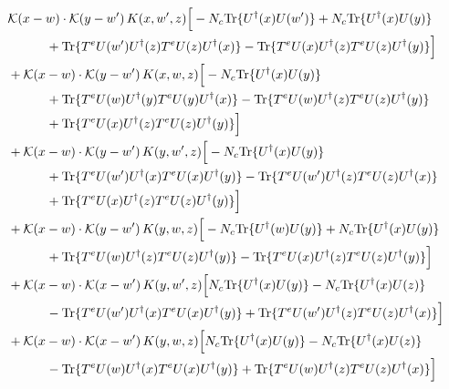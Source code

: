 \documentclass[10pt]{article}
\numberwithin{equation}{section}
\begin{document}
\begin{align}
&\mathcal K(x-w)\cdot\mathcal K(y-w')\,K(x,w',z)\Big[-N_c{\rm Tr}\{U^\dagger(x)U(w')\}+N_c{\rm Tr}\{U^\dagger(x)U(y)\}\notag\\
&\quad\quad\quad+{\rm Tr}\{T^eU(w')U^\dagger(z)T^eU(z)U^\dagger(x)\}-{\rm Tr}\{T^eU(x)U^\dagger(z)T^eU(z)U^\dagger(y)\}\Big]\notag\\
&+\mathcal K(x-w)\cdot\mathcal K(y-w')\,K(x,w,z)\Big[-N_c{\rm Tr}\{U^\dagger(x)U(y)\}\notag\\
&\quad\quad\quad+{\rm Tr}\{T^eU(w)U^\dagger(y)T^eU(y)U^\dagger(x)\}-{\rm Tr}\{T^eU(w)U^\dagger(z)T^eU(z)U^\dagger(y)\}\notag\\
&\quad\quad\quad+{\rm Tr}\{T^eU(x)U^\dagger(z)T^eU(z)U^\dagger(y)\}\Big]\notag\\
&+\mathcal K(x-w)\cdot\mathcal K(y-w')\,K(y,w',z)\Big[-N_c{\rm Tr}\{U^\dagger(x)U(y)\}\notag\\
&\quad\quad\quad+{\rm Tr}\{T^eU(w')U^\dagger(x)T^eU(x)U^\dagger(y)\}-{\rm Tr}\{T^eU(w')U^\dagger(z)T^eU(z)U^\dagger(x)\}\notag\\
&\quad\quad\quad+{\rm Tr}\{T^eU(x)U^\dagger(z)T^eU(z)U^\dagger(y)\}\Big]\notag\\
&+\mathcal K(x-w)\cdot\mathcal K(y-w')\,K(y,w,z)\Big[-N_c{\rm Tr}\{U^\dagger(w)U(y)\}+N_c{\rm Tr}\{U^\dagger(x)U(y)\}\notag\\
&\quad\quad\quad+{\rm Tr}\{T^eU(w)U^\dagger(z)T^eU(z)U^\dagger(y)\}-{\rm Tr}\{T^eU(x)U^\dagger(z)T^eU(z)U^\dagger(y)\}\Big]\notag\\
&+\mathcal K(x-w)\cdot\mathcal K(x-w')\,K(y,w',z)\Big[N_c{\rm Tr}\{U^\dagger(x)U(y)\}-N_c{\rm Tr}\{U^\dagger(x)U(z)\}\notag\\
&\quad\quad\quad-{\rm Tr}\{T^eU(w')U^\dagger(x)T^eU(x)U^\dagger(y)\}+{\rm Tr}\{T^eU(w')U^\dagger(z)T^eU(z)U^\dagger(x)\}\Big]\notag\\
&+\mathcal K(x-w)\cdot\mathcal K(x-w')\,K(y,w,z)\Big[N_c{\rm Tr}\{U^\dagger(x)U(y)\}-N_c{\rm Tr}\{U^\dagger(x)U(z)\}\notag\\
&\quad\quad\quad-{\rm Tr}\{T^eU(w)U^\dagger(x)T^eU(x)U^\dagger(y)\}+{\rm Tr}\{T^eU(w)U^\dagger(z)T^eU(z)U^\dagger(x)\}\Big]
\label{eq:G3VI}
\end{align}

\appendix
\end{document}
